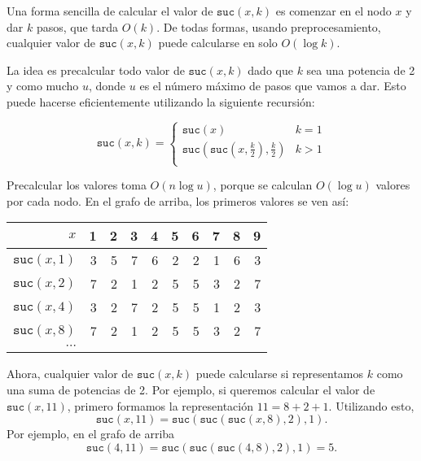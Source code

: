 Una forma sencilla de calcular el valor de $\texttt{suc}(x,k)$ es
comenzar en el nodo $x$ y dar $k$ pasos, que tarda $O(k)$.
De todas formas, usando preprocesamiento, cualquier valor de
$\texttt{suc}(x,k)$ puede calcularse en solo $O(\log k)$.

La idea es precalcular todo valor de $\texttt{suc}(x,k)$ dado que
$k$ sea una potencia de 2 y como mucho $u$, donde $u$ es el número
máximo de pasos que vamos a dar. Esto puede hacerse eficientemente
utilizando la siguiente recursión:

\begin{equation*}
    \texttt{suc}(x,k) = \begin{cases}
        \texttt{suc}(x)                                       & k = 1 \\
        \texttt{suc}(\texttt{suc}(x,\frac{k}{2}),\frac{k}{2}) & k > 1 \\
    \end{cases}
\end{equation*}

Precalcular los valores toma $O(n \log u)$, porque se calculan
$O(\log u)$ valores por cada nodo. En el grafo de arriba, los primeros
valores se ven así:

\begin{center}
    \begin{tabular}{r|rrrrrrrrr}
        $x$                 & 1 & 2 & 3 & 4 & 5 & 6 & 7 & 8 & 9 \\
        \hline
        $\texttt{suc}(x,1)$ & 3 & 5 & 7 & 6 & 2 & 2 & 1 & 6 & 3 \\
        $\texttt{suc}(x,2)$ & 7 & 2 & 1 & 2 & 5 & 5 & 3 & 2 & 7 \\
        $\texttt{suc}(x,4)$ & 3 & 2 & 7 & 2 & 5 & 5 & 1 & 2 & 3 \\
        $\texttt{suc}(x,8)$ & 7 & 2 & 1 & 2 & 5 & 5 & 3 & 2 & 7 \\
        $\cdots$                                                \\
    \end{tabular}
\end{center}

Ahora, cualquier valor de $\texttt{suc}(x,k)$ puede calcularse si
representamos $k$ como una suma de potencias de 2. Por ejemplo, si
queremos calcular el valor de $\texttt{suc}(x,11)$, primero formamos
la representación $11=8+2+1$. Utilizando esto,
\[\texttt{suc}(x,11)=\texttt{suc}(\texttt{suc}(\texttt{suc}(x,8),2),1).\]
Por ejemplo, en el grafo de arriba
\[\texttt{suc}(4,11)=\texttt{suc}(\texttt{suc}(\texttt{suc}(4,8),2),1)=5.\]

